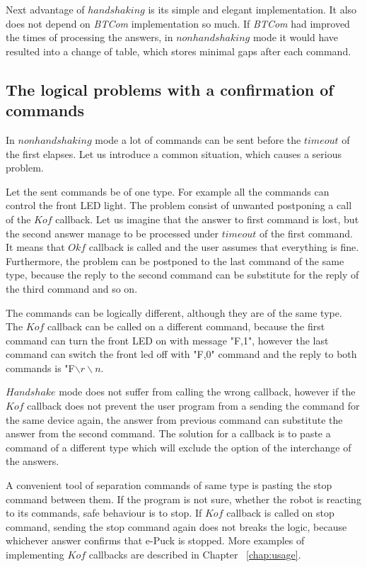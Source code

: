   Next advantage of $handshaking$ is its simple and elegant implementation. It also does not depend on {\it BTCom} implementation so much.
  If {\it BTCom} had improved the times of processing the answers,
  in $nonhandshaking$ mode it would have resulted into a change of table, which stores minimal gaps after each command.



  \subsection{The logical problems with a confirmation of commands}\label{sec:logical}
  In $nonhandshaking$ mode a lot of commands can be sent before the $timeout$ of the first elapses.
  Let us introduce a common situation, which causes a serious problem. 
  
  Let the sent commands be of one type. For example all the commands can control the front LED light.	
  The problem consist of unwanted postponing a call of the $Kof$ callback. 
  Let us imagine that the answer to first command
  is lost, but the second answer manage to be processed under $timeout$ of the first command.
  It means that $Okf$ callback is called and the user assumes that everything is fine.
  Furthermore, the problem can be postponed to the last command of the same type,
  because the reply to the second command can be substitute for the reply of the third command
  and so on.

  The commands can be logically different, although they are of the same type.
  The $Kof$ callback can be called on a different command, because the first command can turn the front LED on 
  with message "F,1", however the last command can switch the front led off with "F,0" command and 
  the reply to both commands is "F$\backslash r\backslash n$.

  $Handshake$ mode does not suffer from calling the wrong callback, however if the $Kof$ callback
  does not prevent the user program from a sending the command for the same device again,
  the answer from previous command can substitute the answer from the second command.
  The solution for a callback is to paste a command of a different type which will exclude the option
  of the interchange of the answers.

  A convenient tool of separation commands of same type is pasting the stop command between them.
  If the program is not sure, whether the robot is reacting to its commands, safe behaviour is to stop.
  If $Kof$ callback is called on stop command, sending the stop command again does not breaks the logic,
  because whichever answer confirms that e-Puck is stopped. More examples of implementing $Kof$ callbacks
  are described in Chapter ~\ref{chap:usage}.

